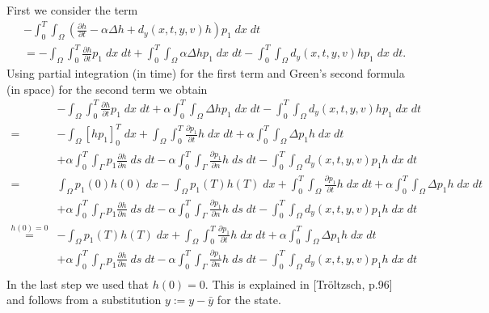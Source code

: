 \documentclass[
12pt, %
a4paper, %
onecolumn, %
portrait %
]{article}
\begin{document}
First we consider the term
\begin{align*}
&- \int_{0}^{T} \int_{\Omega} (\frac{\partial h}{\partial t} - \alpha \Delta h + d_y(x,t,y,v) h) p_1 \; dx \; dt \\
& = - \int_{\Omega} \int_{0}^{T} \frac{\partial h}{\partial t} p_1 \; dx \; dt + \int_{0}^{T} \int_{\Omega} \alpha \Delta h p_1 \; dx \; dt - \int_{0}^{T} \int_{\Omega} d_y(x,t,y,v) h p_1 \; dx \; dt.
\end{align*}
Using partial integration (in time) for the first term and Green's second formula (in space) for the second term we obtain
\begin{align*}
&- \int_{\Omega} \int_{0}^{T} \frac{\partial h}{\partial t} p_1 \; dx \; dt + \alpha \int_{0}^{T} \int_{\Omega}  \Delta h p_1 \; dx \; dt - \int_{0}^{T} \int_{\Omega} d_y(x,t,y,v) h p_1 \; dx \; dt\\
= &- \int_{\Omega} \left[h p_1 \right]_0^T \; dx + \int_{\Omega} \int_{0}^{T}   \frac{\partial p_1}{\partial t} h \; dx \; dt + \alpha \int_{0}^{T} \int_{\Omega} \Delta p_1 h \; dx \; dt \\ 
&+ \alpha \int_{0}^{T} \int_{\Gamma}
p_1 \frac{\partial h}{\partial n} \; ds \; dt - \alpha \int_{0}^{T} \int_{\Gamma}
\frac{\partial p_1}{\partial n} h \; ds \; dt
 - \int_{0}^{T} \int_{\Omega} d_y(x,t,y,v) p_1 h \; dx \; dt \\
= &\int_{\Omega} p_1(0) h(0) \; dx - \int_{\Omega} p_1(T) h(T) \; dx +  \int_{0}^{T} \int_{\Omega} \frac{\partial p_1}{\partial t} h \; dx \; dt + \alpha \int_{0}^{T} \int_{\Omega} \Delta p_1 h \; dx \; dt \\ 
&+ \alpha \int_{0}^{T} \int_{\Gamma}
p_1 \frac{\partial h}{\partial n} \; ds \; dt - \alpha \int_{0}^{T} \int_{\Gamma}
\frac{\partial p_1}{\partial n} h \; ds \; dt
 - \int_{0}^{T} \int_{\Omega} d_y(x,t,y,v) p_1 h \; dx \; dt \\
 \overset{h(0)=0}{=} & - \int_{\Omega} p_1(T) h(T) \; dx + \int_{\Omega} \int_{0}^{T}   \frac{\partial p_1}{\partial t} h \; dx \; dt + \alpha \int_{0}^{T} \int_{\Omega} \Delta p_1 h \; dx \; dt \\ 
&+ \alpha \int_{0}^{T} \int_{\Gamma}
p_1 \frac{\partial h}{\partial n} \; ds \; dt - \alpha \int_{0}^{T} \int_{\Gamma} \frac{\partial p_1}{\partial n} h \; ds \; dt
 - \int_{0}^{T} \int_{\Omega} d_y(x,t,y,v) p_1 h \; dx \; dt \\
\end{align*}
In the last step we used that $h(0) = 0$. This is explained in [Tr\"oltzsch, p.96] and follows from a substitution $y := y - \bar{y}$ for the state.\\
\end{document}
